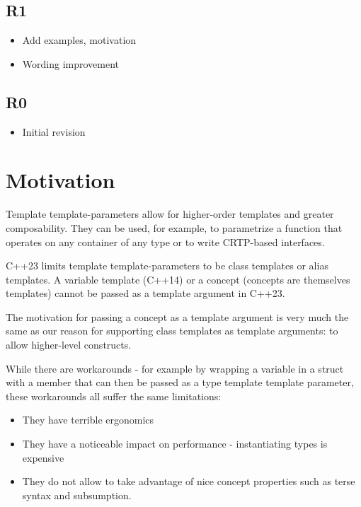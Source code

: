 \documentclass{wg21}
\begin{document}
\subsection{R1}

\begin{itemize}
\item Add examples, motivation
\item Wording improvement
\end{itemize}

\subsection{R0}

\begin{itemize}
    \item{Initial revision}
\end{itemize}



\section{Motivation}

Template template-parameters allow for higher-order templates and greater composability.
They can be used, for example, to parametrize a function that operates on any container of any type or to write CRTP-based interfaces.

C++23 limits template template-parameters to be class templates or alias templates.
A variable template (C++14) or a concept (concepts are themselves templates) cannot be passed as a template argument in C++23.

The motivation for passing a concept as a template argument is very much the same as our reason for supporting class templates as template arguments: to allow higher-level constructs.

While there are workarounds - for example by wrapping a variable in a struct with a  member that can then be passed as a type template template parameter, these workarounds
all suffer the same limitations:

\begin{itemize}
    \item They have terrible ergonomics
    \item They have a noticeable impact on performance - instantiating types is expensive
    \item They do not allow to take advantage of nice concept properties such as terse syntax and subsumption.
\end{itemize}
\end{document}
